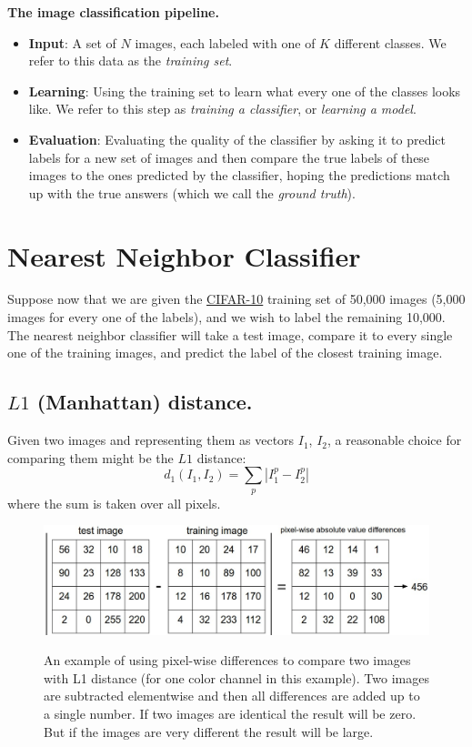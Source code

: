 \textbf{The image classification pipeline.} 
\begin{itemize}
  \item \textbf{Input}: A set of $N$ images, each labeled with one of $K$ different classes. We refer to this data as the \emph{training set}.
  \item \textbf{Learning}: Using the training set to learn what every one of the classes looks like. We refer to this step as \emph{training a classifier}, or \emph{learning a model}.
  \item \textbf{Evaluation}: Evaluating the quality of the classifier by asking it to predict labels for a new set of images and then compare the true labels of these images to the ones predicted by the classifier, hoping the predictions match up with the true answers (which we call the \emph{ground truth}).
\end{itemize}

\section{Nearest Neighbor Classifier}

Suppose now that we are given the \href{http://www.cs.toronto.edu/~kriz/cifar.html}{CIFAR-10} training set of 50,000 images (5,000 images for every one of the labels), and we wish to label the remaining 10,000.
The nearest neighbor classifier will take a test image, compare it to every single one of the training images, and predict the label of the closest training image. 

\subsection{$L1$ (Manhattan) distance.}
Given two images and representing them as vectors $I_1$, $I_2$, a reasonable choice for comparing them might be the $L1$ distance:
$$d_1(I_1,I_2)=\sum_p|I^p_1-I_2^p|$$
where the sum is taken over all pixels. 
\begin{figure}[ht]
  \centering
  \includegraphics[width=5 in]{pic/nneg}\\
  \caption{An example of using pixel-wise differences to compare two images with L1 distance (for one color channel in this example). Two images are subtracted elementwise and then all differences are added up to a single number. If two images are identical the result will be zero. But if the images are very different the result will be large.}
\end{figure}

